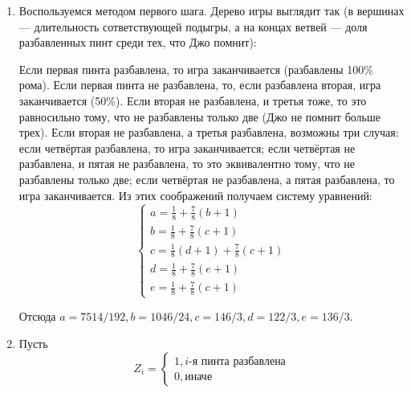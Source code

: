 \begin{enumerate}

\item Воспользуемся методом первого шага. Дерево игры выглядит так (в вершинах — длительность сответствующей подыгры, а на концах ветвей — доля разбавленных пинт среди тех, что Джо помнит):
\begin{center}
\end{center}

Если первая пинта разбавлена, то игра заканчивается (разбавлены 100\% рома).
Если первая пинта не разбавлена, то, если разбавлена вторая, игра заканчивается (50\%).
Если вторая не разбавлена, и третья тоже, то это равносильно тому, что не разбавлены только две (Джо не помнит больше трех).
Если вторая не разбавлена, а третья разбавлена, возможны три случая: если четвёртая разбавлена, то игра заканчивается;
если четвёртая не разбавлена, и пятая не разбавлена, то это эквивалентно тому, что не разбавлены только две;
если четвёртая не разбавлена, а пятая разбавлена, то игра заканчивается.
Из этих соображений получаем систему уравнений:
\[
\begin{cases}a=\frac{1}{8}+\frac{7}{8}(b+1)\\
b=\frac{1}{8}+\frac{7}{8}(c+1)\\
c=\frac{1}{8}(d+1)+\frac{7}{8}(c+1)\\
d=\frac{1}{8}+\frac{7}{8}(e+1)\\
e=\frac{1}{8}+\frac{7}{8}(c+1)
\end{cases}
\]

Отсюда $a=7514/192,b=1046/24,c=146/3,d=122/3,e=136/3$.

\item Пусть
\[
Z_i=\begin{cases}1, i \mbox{-я пинта разбавлена} \\
0, \mbox{иначе}
\end{cases}
\]


\end{enumerate}
